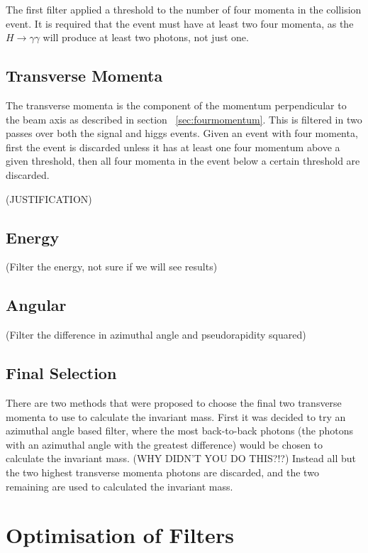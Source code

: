 \documentclass[11pt]{amsart}
\begin{document}
\begin{multicols}{2}
The first filter applied a threshold to the number of four momenta in the collision event. It is required that the event must have at least two four momenta, as the $H \to \gamma\gamma$ will produce at least two photons, not just one.

\subsection{Transverse Momenta}

The transverse momenta is the component of the momentum perpendicular to the beam axis as described in section ~\ref{sec:fourmomentum}. This is filtered in two passes over both the signal and higgs events. Given an event with four momenta, first the event is discarded unless it has at least one four momentum above a given threshold, then all four momenta in the event below a certain threshold are discarded.

(JUSTIFICATION)

\subsection{Energy}

(Filter the energy, not sure if we will see results)

\subsection{Angular}

(Filter the difference in azimuthal angle and pseudorapidity squared)

\subsection{Final Selection}

There are two methods that were proposed to choose the final two transverse momenta to use to calculate the invariant mass. First it was decided to try an azimuthal angle based filter, where the most back-to-back photons (the photons with an azimuthal angle with the greatest difference) would be chosen to calculate the invariant mass. (WHY DIDN'T YOU DO THIS?!?) Instead all but the two highest transverse momenta photons are discarded, and the two remaining are used to calculated the invariant mass.


\section{Optimisation of Filters}
\label{sec:optimisation}


\end{multicols}
\end{document}
